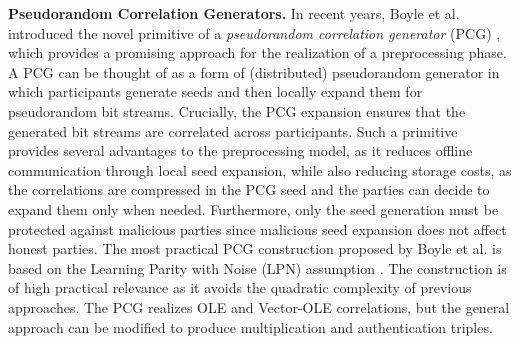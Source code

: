 \textbf{Pseudorandom Correlation Generators.} In recent years, Boyle et al. introduced the novel primitive of a \textit{pseudorandom correlation generator} (PCG) \cite{boyle2019efficient, boyle2020efficient}, which provides a promising approach for the realization of a preprocessing phase. A PCG can be thought of as a form of (distributed) pseudorandom generator in which participants generate seeds and then locally expand them for pseudorandom bit streams. Crucially, the PCG expansion ensures that the generated bit streams are correlated across participants. Such a primitive provides several advantages to the preprocessing model, as it reduces offline communication through local seed expansion, while also reducing storage costs, as the correlations are compressed in the PCG seed and the parties can decide to expand them only when needed. Furthermore, only the seed generation must be protected against malicious parties since malicious seed expansion does not affect honest parties. The most practical PCG construction proposed by Boyle et al. \cite{boyle2020efficient} is based on the Learning Parity with Noise (LPN) assumption \cite{pietrzak2012cryptography}. The construction is of high practical relevance as it avoids the quadratic complexity of previous approaches. The PCG realizes OLE and Vector-OLE correlations, but the general approach can be modified to produce multiplication and authentication triples.
\\\\
